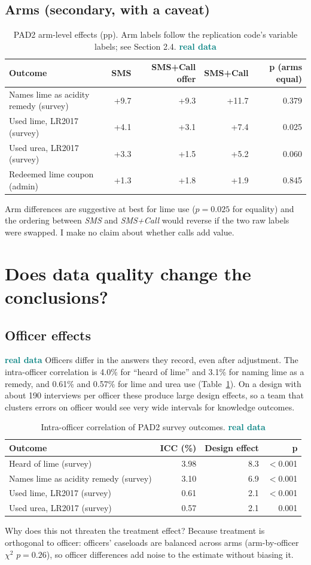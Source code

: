 \documentclass[11pt,a4paper]{article}
\newcommand{\real}{\textcolor{teal}{\sffamily\bfseries real data}}
\begin{document}
\subsection{Arms (secondary, with a caveat)}
\begin{table}[H]\centering\small\setlength{\tabcolsep}{5pt}\begin{tabular}{lrrrr}
\toprule
Outcome & SMS & SMS+Call offer & SMS+Call & p (arms equal) \\
\midrule
Names lime as acidity remedy (survey) & +9.7 & +9.3 & +11.7 & 0.379 \\
Used lime, LR2017 (survey) & +4.1 & +3.1 & +7.4 & 0.025 \\
Used urea, LR2017 (survey) & +3.3 & +1.5 & +5.2 & 0.060 \\
Redeemed lime coupon (admin) & +1.3 & +1.8 & +1.9 & 0.845 \\
\bottomrule
\end{tabular}\caption{PAD2 arm-level effects (pp). Arm labels follow the replication code's variable labels; see Section 2.4. \real}\end{table}
Arm differences are suggestive at best for lime use ($p=0.025$ for equality) and the ordering between \emph{SMS} and \emph{SMS+Call} would reverse if the two raw labels were swapped. I make no claim about whether calls add value.

\section{Does data quality change the conclusions?}\label{sec:robust}
\subsection{Officer effects}
\real{} Officers differ in the answers they record, even after adjustment. The intra-officer correlation is 4.0\% for ``heard of lime'' and 3.1\% for naming lime as a remedy, and 0.61\% and 0.57\% for lime and urea use (Table~\ref{tab:icc}). On a design with about 190 interviews per officer these produce large design effects, so a team that clusters errors on officer would see very wide intervals for knowledge outcomes.
\begin{table}[H]\centering\small\setlength{\tabcolsep}{5pt}\begin{tabular}{lrrr}
\toprule
Outcome & ICC (\%) & Design effect & p \\
\midrule
Heard of lime (survey) & 3.98 & 8.3 & $<$0.001 \\
Names lime as acidity remedy (survey) & 3.10 & 6.9 & $<$0.001 \\
Used lime, LR2017 (survey) & 0.61 & 2.1 & $<$0.001 \\
Used urea, LR2017 (survey) & 0.57 & 2.1 & 0.001 \\
\bottomrule
\end{tabular}\caption{Intra-officer correlation of PAD2 survey outcomes. \real}\label{tab:icc}\end{table}
Why does this not threaten the treatment effect? Because treatment is orthogonal to officer: officers' caseloads are balanced across arms (arm-by-officer $\chi^2$ $p=0.26$), so officer differences add noise to the estimate without biasing it.
\end{document}
